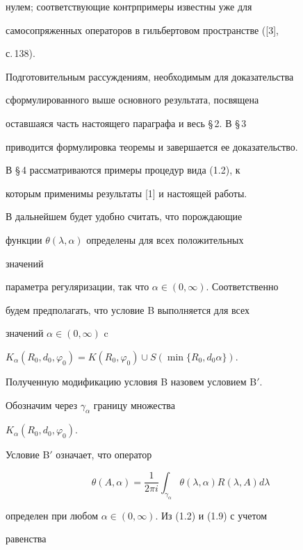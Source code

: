 нулем; соответствующие контрпримеры известны уже для 


самосопряженных операторов в гильбертовом пространстве ([3],


с.\,138).





Подготовительным рассуждениям, необходимым для доказательства 


сформулированного выше основного результата, посвящена 


оставшаяся часть настоящего параграфа и весь \S\,2. В \S\,3


приводится формулировка теоремы и завершается ее доказательство. 


В \S\,4 рассматриваются примеры процедур вида (1.2), к 


которым применимы результаты [1] и настоящей работы.





В дальнейшем будет удобно считать, что порождающие 


функции $\theta(\lambda,\alpha)$ определены для всех положительных 


значений 


параметра регуляризации, так что $\alpha\in(0,\infty)$. Соответственно 


будем предполагать, что условие B выполняется для всех 


значений $\alpha\in(0,\infty)$ c 


$K_\alpha(R_0,d_0,\varphi_0)=K(R_0,\varphi_0)\cup 


S(\min\{R_0,d_0\alpha\})$.


Полученную модификацию условия B назовем условием B$'$. 


Обозначим через $\gamma_\alpha$ границу множества 


$K_\alpha(R_0,d_0,\varphi_0)$.


Условие B$'$ означает, что оператор


\begin{equation}


\theta(A,\alpha)=\frac{1}{2\pi i}\int_{\gamma_\alpha}


\theta(\lambda,\alpha)R(\lambda,A)d\lambda


\end{equation}


определен при любом $\alpha\in(0,\infty)$. Из (1.2) и (1.9) с учетом 


равенства 



